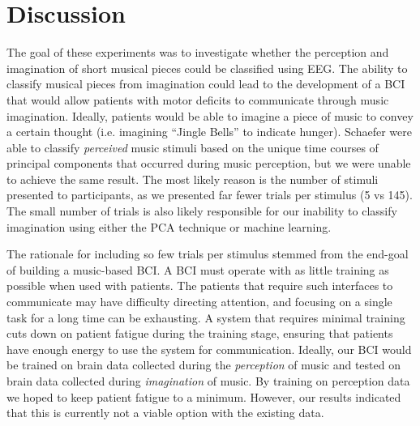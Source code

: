 \chapter{Discussion}
The goal of these experiments was to investigate whether the perception and imagination of short musical pieces could be classified using EEG.  
The ability to classify musical pieces from imagination could lead to the development of a \ac{BCI} that would allow patients with motor deficits to communicate through music imagination.
Ideally, patients would be able to imagine a piece of music to convey a certain thought (i.e. imagining ``Jingle Bells'' to indicate hunger).
Schaefer \etal \citeyear{schaefer_name_2011} were able to classify \emph{perceived} music stimuli based on the unique time courses of principal components that occurred during music perception, but we were unable to achieve the same result. 
The most likely reason is the number of stimuli presented to participants, as we presented far fewer trials per stimulus (5 vs 145). 
The small number of trials is also likely responsible for our inability to classify imagination using either the PCA technique or machine learning. 

The rationale for including so few trials per stimulus stemmed from the end-goal of building a music-based \ac{BCI}. 
A \ac{BCI} must operate with as little training as possible when used with patients.
The patients that require such interfaces to communicate may have difficulty directing attention, and focusing on a single task for a long time can be exhausting. 
A system that requires minimal training cuts down on patient fatigue during the training stage, ensuring that patients have enough energy to use the system for communication. 
Ideally, our \ac{BCI} would be trained on brain data collected during the \emph{perception} of music and tested on brain data collected during \emph{imagination} of music. 
By training on perception data we hoped to keep patient fatigue to a minimum. 
However, our results indicated that this is currently not a viable option with the existing data.  

